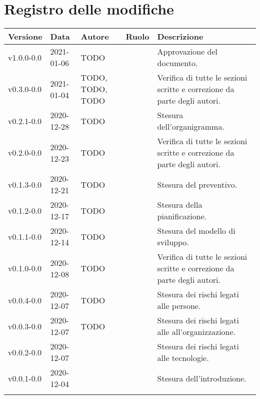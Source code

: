 \section*{\hfil Registro delle modifiche \hfil}
{
	\newlength{\freewidth}
	\setlength{\freewidth}{\dimexpr\textwidth-10\tabcolsep}
	\renewcommand{\arraystretch}{1.5}
	\centering
	\setlength{\aboverulesep}{0pt}
	\setlength{\belowrulesep}{0pt}
	\begin{longtable}{C{.131777\freewidth} C{.134036\freewidth} C{.263554\freewidth} C{.188254\freewidth} C{.282379\freewidth}}
		\toprule 
		\textbf{Versione} & \textbf{Data} & \textbf{Autore} & \textbf{Ruolo} & \textbf{Descrizione}\\
		\toprule
		\endhead

		v1.0.0-0.0 & 2021-01-06 & TODO & \RdP{} & Approvazione del documento. \\
		v0.3.0-0.0 & 2021-01-04 & TODO, TODO, TODO & \vers{} & Verifica di tutte le sezioni scritte e correzione da parte degli autori. \\

		v0.2.1-0.0 & 2020-12-28 & TODO & \ana{} & Stesura dell'organigramma. \\

		v0.2.0-0.0 & 2020-12-23 & TODO & \ver{} & Verifica di tutte le sezioni scritte e correzione da parte degli autori. \\
		v0.1.3-0.0 & 2020-12-21 & TODO & \ana{} & Stesura del preventivo. \\
		v0.1.2-0.0 & 2020-12-17 & TODO & \ana{} & Stesura della pianificazione. \\
		v0.1.1-0.0 & 2020-12-14 & TODO & \ana{} & Stesura del modello di sviluppo. \\

		v0.1.0-0.0 & 2020-12-08 & TODO & \ver{} & Verifica di tutte le sezioni scritte e correzione da parte degli autori. \\
		v0.0.4-0.0 & 2020-12-07 & TODO & \ana{} & Stesura dei rischi legati alle persone. \\
		v0.0.3-0.0 & 2020-12-07 & TODO & \ana{} & Stesura dei rischi legati alle all'organizzazione. \\
		v0.0.2-0.0 & 2020-12-07 & \Matteo{} & \ana{} & Stesura dei rischi legati alle tecnologie. \\
		v0.0.1-0.0 & 2020-12-04 & \Tommaso{} & \ana{} & Stesura dell'introduzione. \\
		
		\bottomrule
		\hiderowcolors
	\end{longtable}
}
